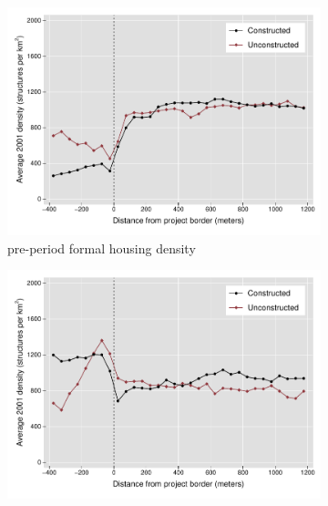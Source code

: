 \documentclass[12pt]{article}
\begin{document}
\begin{figure}[t!]
        \centering
        \caption[ Housing Densities in Constructed and Unconstructed Projects Areas ]
        {\small Housing Densities in Constructed and Unconstructed projects } 
        \begin{subfigure}[b]{0.495\textwidth}
            \centering
            \includegraphics[width=\textwidth,trim={0.3cm .3cm 0.1cm 0cm}, clip=true]{figures/bblu_for_pre_means}
            \caption[Network2]%
            {{\small pre-period formal housing density}}    
            \label{fig:prefor}
        \end{subfigure}
        \hfill
        \begin{subfigure}[b]{0.495\textwidth}  
            \centering 
            \includegraphics[width=\textwidth,trim={0.3cm .3cm 0.1cm 0cm}, clip=true]{figures/bblu_inf_pre_means}

\end{subfigure}
\end{figure}
\end{document}
